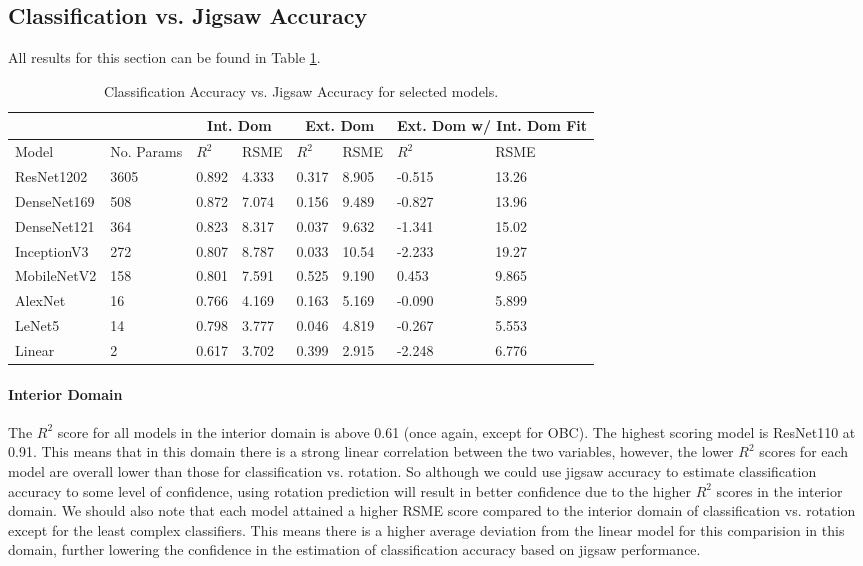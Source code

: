 \documentclass{article}
\begin{document}
\subsection{Classification vs. Jigsaw Accuracy}\label{cvja}
All results for this section can be found in Table \ref{tbl:cavja}.
\begin{table}[!pt]
  \centering
  \caption{Classification Accuracy vs. Jigsaw Accuracy for selected models.}\label{tbl:cavja}
  \begin{tabular}{llllllll}
  \cline{1-8}
  \multicolumn{2}{c}{}           & \multicolumn{2}{c}{Int. Dom}     & \multicolumn{2}{c}{Ext. Dom}          & \multicolumn{2}{c}{Ext. Dom w/ Int. Dom Fit}            \\ \hline
  Model & No. Params & $R^2$ & RSME & $R^2$ & RSME & $R^2$ & RSME \\ \hline
  ResNet1202   &   3605   &  0.892  &   4.333   &    0.317    &   8.905   &    -0.515     &   13.26   \\ 
  DenseNet169   &   508   &  0.872  &   7.074   &    0.156    &   9.489   &    -0.827     &   13.96   \\ 
  DenseNet121   &   364   &  0.823  &   8.317   &    0.037    &   9.632   &    -1.341     &   15.02   \\ 
  InceptionV3   &   272   &  0.807  &   8.787   &    0.033    &   10.54   &    -2.233     &   19.27   \\ 
  MobileNetV2   &   158   &  0.801  &   7.591   &    0.525    &   9.190   &    0.453      &   9.865   \\ 
  AlexNet       &    16   &  0.766  &   4.169   &    0.163    &   5.169   &    -0.090     &   5.899   \\ 
  LeNet5        &    14   &  0.798  &   3.777   &    0.046    &   4.819   &    -0.267     &   5.553   \\ 
  Linear        &     2   &  0.617  &   3.702   &    0.399    &   2.915   &    -2.248     &   6.776   \\ \hline
  \end{tabular}
\end{table}
\paragraph{Interior Domain} The \(R^2\) score for all models in the interior domain is above 0.61 (once again, except for OBC). The highest scoring model is ResNet110 at 0.91. This means that in this domain there is a strong linear correlation between the two variables, however, the lower $R^2$ scores for each model are overall lower than those for classification vs. rotation. So although we could use jigsaw accuracy to estimate classification accuracy to some level of confidence, using rotation prediction will result in better confidence due to the higher $R^2$ scores in the interior domain. We should also note that each model attained a higher RSME score compared to the interior domain of classification vs. rotation except for the least complex classifiers. This means there is a higher average deviation from the linear model for this comparision in this domain, further lowering the confidence in the estimation of classification accuracy based on jigsaw performance.
\end{document}
